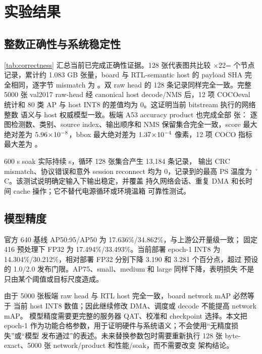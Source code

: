 \section{实验结果}
\label{sec:results}

\subsection{整数正确性与系统稳定性}

\cref{tab:correctness} 汇总当前已完成正确性证据。128 张代表图共比较
\ConformanceImages{}$\times$22=\NodeRecords{} 个节点记录，累计约 1.083 GB
张量，board 与 RTL-semantic host 的 payload SHA 完全相同，逐字节 mismatch
为 \NodeMismatches{}。双 raw head 的 128 条记录同样完全一致。完整 5000 张
val2017 raw-head 经 canonical host decode/NMS 后，12 项 COCOeval 统计和
80 类 AP 与 host INT8 的差值均为 0。这证明当前 bitstream 执行的网络整数
语义与 host 权威模型一致。板端 A53 accuracy product 也完成全部
\ProductImages{} 张：
逐图检测数、类别、source index、输出顺序和 NMS 保留集合完全一致，score
最大绝对差为 $5.96\!\times\!10^{-8}$，bbox 最大绝对差为
$1.37\!\times\!10^{-4}$ 像素，12 项 COCO 指标最大差为 \ProductMetricDelta{}。



600 s soak 实际持续 \SoakSeconds{} s，循环 128 张集合产生 13,184 条记录，
输出 CRC mismatch、协议错误和意外 session reconnect 均为 0，记录到的最高
PS 温度为 \SoakTempC{}\,$^\circ$C。该测试说明确定输入下输出稳定，并覆盖
持久网络会话、重复 DMA 和长时间 cache 操作；它不替代电源循环或环境温箱
可靠性测试。



\subsection{模型精度}



官方 640 基线 AP50:95/AP50 为 17.636\%/34.862\%，与上游公开量级一致；
固定 416 预处理下 FP32 为 17.494\%/33.493\%。当前部署 epoch-1 INT8 为
14.304\%/30.212\%，相对部署 FP32 分别下降 3.190 和 3.281 个百分点，超过
预设的 1.0/2.0 发布门限。AP75、small、medium 和 large 同样下降，表明损失
不是只由某个阈值或目标尺度造成。

由于 5000 张板端 raw head 与 RTL host 完全一致，board network mAP 必然等于
当前 host INT8 数值；因此继续修改 DMA、调度或 decode 不能提高 network mAP。
模型精度需要更完整的服务器 QAT、校准和 checkpoint 选择。本文把 epoch-1
作为功能合格参数，用于证明硬件与系统语义；不会使用“无精度损失”或“模型
发布通过”的表述。未来替换参数包时需要重新执行 128 张 byte-exact、5000 张
network/product 和性能/soak，而不需要改变 \LASA 架构结论。

